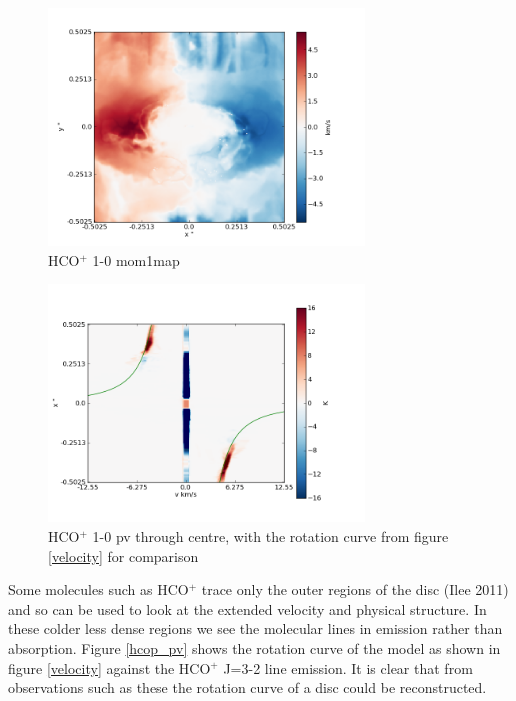 \documentclass[useAMS,usenatbib]{mn2e}
\begin{document}
\begin{figure}
 \includegraphics[width=84mm]{Figures/sim/imageHCOp_1-0_30deg_mom1.png}

 \caption{HCO$^+$ 1-0 mom1map}
\end{figure}

\begin{figure}
 \includegraphics[width=84mm]{Figures/sim/imageHCOp_1-0_30deg_PV_centre.png}

 \caption{HCO$^+$ 1-0 pv through centre, with the rotation curve from figure \ref{velocity} for comparison}
\end{figure}


Some molecules such as HCO$^+$ trace only the outer regions of the disc (Ilee 2011) and so can be used to look at the extended velocity and physical structure. In these colder less dense regions we see the molecular lines in emission rather than absorption. Figure \ref{hcop_pv} shows the rotation curve of the model as shown in figure \ref{velocity} against the HCO$^+$ J=3-2 line emission. It is clear that from observations such as these the rotation curve of a disc could be reconstructed.\newline
\newline
\end{document}
